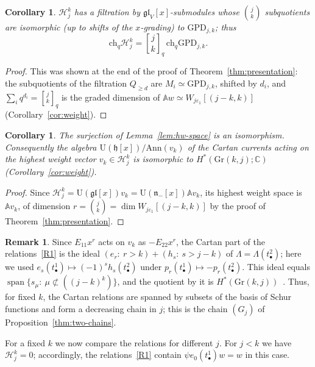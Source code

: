 \documentclass[11pt]{amsart}
\numberwithin{equation}{section}
\newtheorem{corollary}[equation]{Corollary}
\theoremstyle{definition}
\newtheorem{remark}[equation]{Remark}
\newcommand{\gl}{\mathfrak{gl}}
\newcommand{\fh}{\mathfrak{h}}
\newcommand{\fn}{\mathfrak{n}}
\newcommand{\U}{\mathrm{U}}
\newcommand{\bA}{\mathbb{A}}          %
\newcommand{\GPD}{\mathrm{GPD}}         %
\newcommand{\eps}{\varepsilon}
\newcommand{\ch}{\mathrm{ch}}
\newcommand{\Ann}{\mathrm{Ann}}
\newcommand{\Gr}{\mathrm{Gr}}
\newcommand{\Lam}{\Lambda}
\newcommand{\qbinom}[2]{\genfrac{[}{]}{0pt}{}{#1}{#2}_{q}}
\DeclareMathOperator{\Span}{span}
\begin{document}
	\begin{corollary}\label{cor:A}
		$\mathcal H_j^k$ has a filtration by $\gl_V[x]$-submodules whose $\binom jk$ subquotients are isomorphic (up to shifts of the $x$-grading) to $\GPD_{j,k}$; thus 
		$$\ch_q\mathcal H_j^k=\qbinom jk\,\ch_q\GPD_{j,k}.$$
	\end{corollary}
	\begin{proof}
		This was shown at the end of the proof of Theorem~\ref{thm:presentation}: the subquotients of the filtration $Q_{\ge d}$ are $M_i\simeq\GPD_{j,k}$, shifted by $d_i$, and $\sum_iq^{d_i}=\qbinom jk$ is the graded dimension of $\bA w\simeq W_{j\eps_1}[(j-k,k)]$ (Corollary~\ref{cor:weight}).
	\end{proof}
	
	\begin{corollary}\label{thm:B}
		The surjection of Lemma~\ref{lem:hw-space} is an isomorphism. Consequently the algebra $\U(\fh[x])/\Ann(v_k)$ of the Cartan currents acting on the highest weight vector $v_k\in\mathcal H_j^k$ is isomorphic to $H^*(\Gr(k,j);\mathbb C)$ (Corollary~\ref{cor:weight}).
	\end{corollary}
	\begin{proof}
		Since $\mathcal H_j^k=\U(\gl[x])v_k=\U(\fn_-[x])\bA v_k$, its highest weight space is $\bA v_k$, of dimension $r=\binom jk=\dim W_{j\eps_1}[(j-k,k)]$ by the proof of Theorem~\ref{thm:presentation}.
	\end{proof}
	
	\begin{remark}\label{thm:Schur-lattice}
		Since $E_{11}x^r$ acts on $v_k$ as $-E_{22}x^r$, the Cartan part of the relations~\ref{R1} is the ideal $(e_r:\ r>k)+(h_s:\ s>j-k)$ of $\Lam=\Lam(t^2_\bullet)$; here we used $e_s(t^1_\bullet)\mapsto(-1)^sh_s(t^2_\bullet)$ under $p_r(t^1_\bullet)\mapsto-p_r(t^2_\bullet)$. This ideal equals $\Span\{s_\mu:\ \mu\not\subset((j-k)^k)\}$, and the quotient by it is $H^*(\Gr(k,j))$~\cite{F}. Thus, for fixed $k$, the Cartan relations are spanned by subsets of the basis of Schur functions and form a decreasing chain in $j$; this is the chain $(G_j)$ of Proposition~\ref{thm:two-chains}.
	\end{remark}
	
	For a fixed $k$ we now compare the relations for different $j$. For $j<k$ we have $\mathcal H_j^k=0$; accordingly, the relations~\ref{R1} contain $\psi e_0(t^1_\bullet)w=w$ in this case.
	
\end{document}
